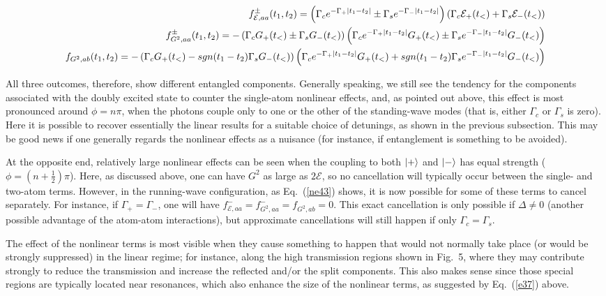 \documentclass[aps,pra,twocolumn,floatfix,superscriptaddress]{revtex4}
\begin{document}
\begin{widetext}
\begin{align}
f_{\mathcal{E},aa}^{\pm}(t_1,t_2) =\left(\Gamma_c e^{-\Gamma_+|t_1-t_2|}\pm \Gamma_s e^{-\Gamma_-|t_1-t_2|}\right) \left(\Gamma_c \mathcal{E}_+(t_<)+ \Gamma_s \mathcal{E}_-(t_<)\right)\cr
f_{G^2,aa}^{\pm}(t_1,t_2)=-\left(\Gamma_c G_+(t_<)\pm \Gamma_s G_-(t_<)\right)\left(\Gamma_c e^{-\Gamma_+|t_1-t_2|}G_+(t_<)\pm \Gamma_s e^{-\Gamma_-|t_1-t_2|}G_-(t_<)\right) \cr
f_{G^2,ab}(t_1,t_2)=-\left(\Gamma_c G_+(t_<)- sgn(t_1-t_2) \Gamma_s G_-(t_<)\right)
\left(\Gamma_c e^{-\Gamma_+|t_1-t_2|}G_+(t_<)+ sgn(t_1-t_2) \Gamma_s e^{-\Gamma_-|t_1-t_2|}G_-(t_<)\right)
\end{align}
\label{ne43}
\end{widetext}
All three outcomes, therefore, show different entangled components.  Generally speaking, we still see the tendency for the components associated with the doubly excited state to counter the single-atom nonlinear effects, and, as pointed out above, this effect is most pronounced around $\phi = n\pi$, when the photons couple only to one or the other of the standing-wave modes (that is, either $\Gamma_c$ or $\Gamma_s$ is zero).  Here it is possible to recover essentially the linear results for a suitable choice of detunings, as shown in the previous subsection.  This may be good news if one generally regards the nonlinear effects as a nuisance (for instance, if entanglement is something to be avoided). 

At the opposite end, relatively large nonlinear effects can be seen when the coupling to both $|+\rangle$ and $|-\rangle$ has equal strength ($\phi=(n+\frac 1 2)\pi$).  Here, as discussed above, one can have $G^2$ as large as $2\mathcal{E}$, so no cancellation will typically occur between the single- and two-atom terms.  However, in the running-wave configuration, as Eq.~(\ref{ne43}) shows, it is now possible for some of these terms to cancel separately.  For instance, if $\Gamma_+ = \Gamma_-$, one will have $f_{\mathcal{E},aa}^{-} = f_{G^2,aa}^{-} = f_{G^2,ab}=0$.  This exact cancellation is only possible if $\Delta\ne 0$ (another possible advantage of the atom-atom interactions), but approximate cancellations will still happen if only $\Gamma_c=\Gamma_s$.

The effect of the nonlinear terms is most visible when they cause something to happen that would not normally take place (or would be strongly suppressed) in the linear regime; for instance, along the high transmission regions shown in Fig.~5, where they may contribute strongly to reduce the transmission and increase the reflected and/or the split components.  This also makes sense since those special regions are typically located near resonances, which also enhance the size of the nonlinear terms, as suggested by Eq.~(\ref{e37}) above.    
\end{document}
